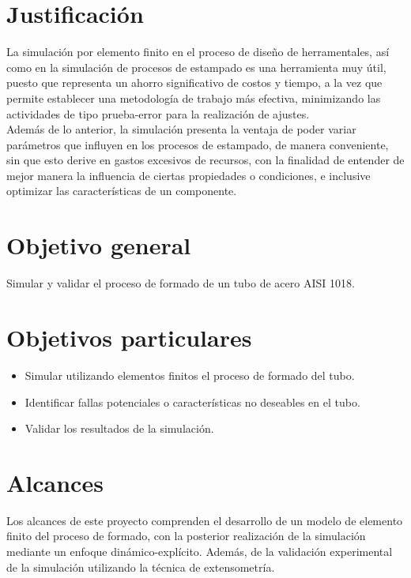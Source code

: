 \section{Justificación}

La simulación por elemento finito en el proceso de diseño de herramentales, así como en 
la simulación de procesos de estampado es una herramienta muy útil, puesto que representa un ahorro 
significativo de costos y tiempo, a la vez que permite establecer una metodología de trabajo más efectiva, minimizando las 
actividades de tipo prueba-error para la realización de ajustes.\\

Además de lo anterior, la simulación presenta la ventaja de poder variar parámetros que influyen en los procesos de 
estampado, de manera conveniente, sin que esto derive en gastos excesivos de recursos, con la finalidad de entender 
de mejor manera la influencia de ciertas propiedades o condiciones, e inclusive optimizar las características 
de un componente.

\section{Objetivo general}

Simular y validar el proceso de formado de un tubo de acero AISI 1018.

\section{Objetivos particulares}
\begin{itemize}
\item Simular utilizando elementos finitos el proceso de formado del tubo.
\item Identificar fallas potenciales o características no deseables en el tubo.
\item Validar los resultados de la simulación.
\end{itemize}


\section{Alcances}

Los alcances de este proyecto comprenden el desarrollo de un modelo de elemento finito del proceso de 
formado, con la posterior realización de la simulación mediante un enfoque dinámico-explícito. Además, 
de la validación experimental de la simulación utilizando la técnica de extensometría.

